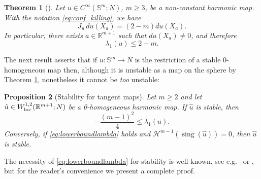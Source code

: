 \documentclass[11pt]{article}
\theoremstyle{plain}
\numberwithin{equation}{section}
\newtheorem{theorem}{Theorem}[section]
\newtheorem{proposition}[theorem]{Proposition}
\theoremstyle{definition}
\def \R {\mathbb{R}}
\def \mc{\mathcal}
\def \mb{\mathbb}
\def \tp{\textup}
\DeclareMathOperator{\sing}{sing}
\begin{document}
\begin{theorem}[{\cite{Xin1980}}]\label{thm:Xin}
Let $u\in C^\infty(\mathbb S^m;N)$, $m\geq 3$, be a
non-constant harmonic map. With the notation \eqref{eq:conf_killing}, we have
\begin{equation}
\label{eq:Xin}
J_u \,du(X_a)=(2-m)du(X_a).
\end{equation}
In particular, there exists
$a\in\mathbb R^{m+1}$ such that $du(X_a)\neq 0$, and therefore
\[
\lambda_1(u)\leq 2-m .
\]
\end{theorem}

The next result asserts that if $u\colon \mb S^m\to N$ is the restriction of a stable  0-homogeneous map then, although  it is unstable as a map on the sphere by Theorem \ref{thm:Xin}, nonetheless it cannot be \textit{too} unstable:

\begin{proposition}[Stability for tangent maps]\label{prop:stabilitycharact}
Let $m\geq2$ and let
$\hat u\in W^{1,2}_\tp{loc}(\R^{m+1};N)$ be a 0-homogeneous harmonic map.
If $\hat u$ is stable, then
\begin{equation}
    \label{eq:lowerboundlambda}
    - \frac{(m-1)^2}{4} \leq \lambda_1(u).
\end{equation}
Conversely, if \eqref{eq:lowerboundlambda} holds and
$\mc H^{m-1}(\sing(\hat u))=0$, then $\hat u$ is stable.
\end{proposition}

The necessity of \eqref{eq:lowerboundlambda} for stability is well-known, see e.g.\ \cite{Schoen1984} or \cite[Lemma 4.2]{Hardt1992a}, but for the reader's convenience we present a complete proof.
\end{document}
